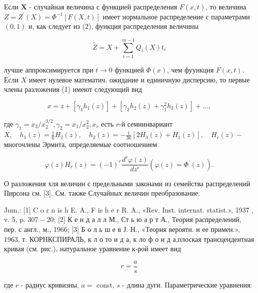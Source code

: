 \documentclass[10pt]{article}
\begin{document}
Если $\boldsymbol{X}$ - случайная величина с функцией распределения $F(x, t)$, то величина $Z=Z^{\prime}(X)=\Phi^{-1}[F(X, t)]$ имеет нормальное распределение с параметрами $(0,1)$ и, как следует из (2), функция распределения величины



\[

\tilde{Z}=X+\sum_{i=1}^{m-1} Q_{i}(X) t_{i}

\]



лучше аппроксимируется при $t \rightarrow 0$ функцией $\Phi(x)$, чем фуункция $F(x, t)$. Если $X$ имеет нулевое математич. ожидание и единичную дисперсию, то первые члены разложения (1) имеют следующий вид



\[

x=z+\left[\gamma_{1} h_{1}(z)\right]+\left[\gamma_{2} h_{2}(z)+\gamma_{1}^{2} h_{3}(z)\right]+\ldots,

\]



где $\gamma_{1}=x_{3} / x_{2}^{3 / 2}, \gamma_{2}=x_{1} / x_{2}^{2}, x_{r}$ есть $r$-й семиинвариант $X, \quad h_{1}(z)=\frac{1}{6} H_{2}(z), \quad h_{2}(z)=-\frac{1}{36}\left[2 H_{3}(z)+H_{1}(z)\right], \quad H_{r}(z)-$ многочлены Эрмита, определяемые соотношением



\[

\varphi(z) H_{r}(z)=(-1)^{r} \frac{d^{r} \varphi(z)}{d z^{r}}\left(\varphi(z)=\Phi^{\prime}(z)\right) .

\]



О разложения хля величин с предельными законами из семейства распределений Пирсона см. [3]. См. также Случайных величин преобразование.



Jum.: [1] C o r n is h E. A., F is h e r R. A., «Rev. Inst. internat. statist.», 1937 , v. 5, p. $307-20$; [2] К е н д а л л М., Ст ь ю а р т А., Теория распределений, пер. с англ., м., 1966; [3] Б о л ь ш е в Ј. Н., «Теория вероятн. и ее примен.», 1963, т. КОРНКСПИРАЛЬ, к л о то и д а, к ло ф о и д а,плоская трансцендентная кривая (см. рис.), натуральное уравнение к-рой имеет вид



\[

r=\frac{a}{s}

\]



где $r$ - радиус кривизны, $a=$ const, $s$ - длина дуги. Параметрические уравнения:
\end{document}
